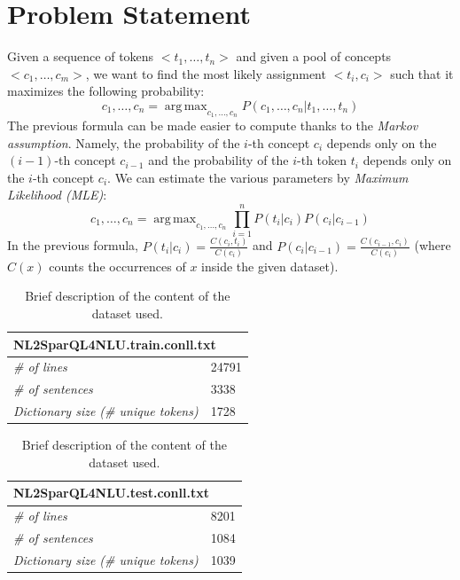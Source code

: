 \documentclass[11pt,a4paper]{article}
\DeclareMathOperator*{\argmax}{arg\,max}
\begin{document}
 

\section{Problem Statement}
Given a sequence of tokens $<t_1, \ldots, t_n>$ and given a pool of concepts $<c_1, \ldots, c_m>$, we want to find the most likely assignment $<t_i, c_i>$ such that it maximizes the following probability:
\begin{equation}
c_1, \ldots, c_n = \argmax_{c_1, \ldots, c_n} P (c_1, \ldots, c_n | t_1, \ldots, t_n)
\label{frm:argmax}
\end{equation}
The previous formula can be made easier to compute thanks to the \textit{Markov assumption}. Namely, the probability of the $i$-th concept $c_i$ depends only on the $(i-1)$-th concept $c_{i-1}$ and the probability of the $i$-th token $t_i$ depends only on the $i$-th concept $c_i$. We can estimate the various parameters by \textit{Maximum Likelihood (MLE)}:
\begin{equation}
c_1, \ldots, c_n = \argmax_{c_1, \ldots, c_n} \prod_{i=1}^n P(t_i|c_i)P(c_i| c_{i-1})
\label{frm:argmax-markov-assumption}
\end{equation}
In the previous formula, $P(t_i|c_i) = \frac{C(c_i, t_i)}{C(c_i)}$ and $P(c_i|c_{i-1}) = \frac{C(c_{i-1}, c_i)}{C(c_i)}$ (where $C(x)$ counts the occurrences of $x$ inside the given dataset). 

\begin{table}
    \begin{subtable}{.5\linewidth}
		\centering
\begin{tabular}{|l|l|}
\hline
\multicolumn{2}{|l|}{\textbf{NL2SparQL4NLU.train.conll.txt}} \\ \hline
\textit{\# of lines}									& 24791 \\ \hline
\textit{\# of sentences}                             & 3338 \\ \hline
\textit{Dictionary size (\# unique tokens)}                         & 1728 \\ \hline
\end{tabular}
\caption{Train dataset.}
\end{subtable}%
\begin{subtable}{.5\linewidth}
\centering
\begin{tabular}{|l|l|}
\hline
\multicolumn{2}{|l|}{\textbf{NL2SparQL4NLU.test.conll.txt}} \\ \hline
\textit{\# of lines}									& 8201 \\ \hline
\textit{\# of sentences}                             & 1084 \\ \hline
\textit{Dictionary size (\# unique tokens)}                         & 1039 \\ \hline
\end{tabular}
\caption{Test dataset.}
\end{subtable}
\caption{Brief description of the content of the dataset used.}
\label{tab:test-dataset-description}
\end{table} 
\end{document}
